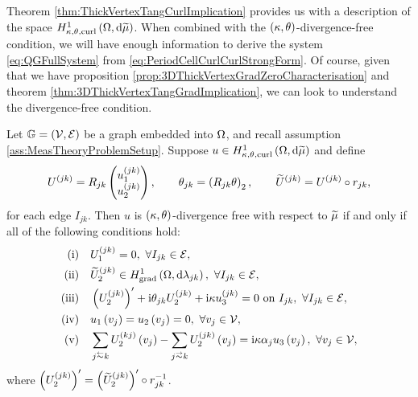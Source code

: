 Theorem \ref{thm:ThickVertexTangCurlImplication} provides us with a description of the space $H^1_{\kappa,\theta,\mathrm{curl}}\left( \Omega, \mathrm{d}\widetilde{\mu} \right)$.
When combined with the $\left( \kappa, \theta \right)$-divergence-free condition, we will have enough information to derive the system \eqref{eq:QGFullSystem} from \eqref{eq:PeriodCellCurlCurlStrongForm}.
Of course, given that we have proposition \ref{prop:3DThickVertexGradZeroCharacterisation} and theorem \ref{thm:3DThickVertexTangGradImplication}, we can look to understand the divergence-free condition.

\begin{prop} \label{prop:ThickVertexDivFree}
	Let $\mathbb{G}=\left( \mathcal{V}, \mathcal{E} \right)$ be a graph embedded into $\Omega$, and recall assumption \ref{ass:MeasTheoryProblemSetup}.
	Suppose $u\in H^1_{\kappa,\theta,\mathrm{curl}}\left( \Omega, \mathrm{d}\widetilde{\mu} \right)$ and define
	\begin{align*}
		U^{(jk)} = R_{jk}\begin{pmatrix} u_1^{(jk)} \\ u_2^{(jk)} \end{pmatrix},
		\qquad \theta_{jk} = \left(  R_{jk}\theta  \right)_2,
		\qquad \widetilde{U}^{(jk)} = U^{(jk)} \circ r_{jk},
	\end{align*}
	for each edge $I_{jk}$.
	Then $u$ is $\left( \kappa, \theta \right)$-divergence free with respect to $\widetilde{\mu}$ if and only if all of the following conditions hold:
	\begin{align*}
			\mathrm{(i)} \quad & U_1^{(jk)} = 0, \ \forall I_{jk}\in\edgeSet, \\
			\mathrm{(ii)} \quad & \widetilde{U}_2^{(jk)} \in\gradSob{\ddom}{\lambda_{jk}}, \ \forall I_{jk}\in\edgeSet, \\
			\mathrm{(iii)} \quad & \bracs{U_2^{(jk)}}' + \rmi\qm_{jk} U_2^{(jk)} + \rmi\wavenumber u_3^{(jk)} = 0 \text{ on } I_{jk}, \ \forall I_{jk}\in\edgeSet, \\
			\mathrm{(iv)} \quad & u_1\bracs{v_j} = u_2\bracs{v_j} = 0, \ \forall v_j\in\vertSet, \\
			\mathrm{(v)} \quad & \sum_{j\conRight k} U_2^{(kj)}\bracs{v_j} - \sum_{j\conLeft k} U_2^{(jk)}\bracs{v_j} = \rmi\wavenumber\alpha_j u_3\bracs{v_j}, \ \forall v_j\in\vertSet,
	\end{align*}
	where $\left( U_2^{(jk)} \right)' = \left( \widetilde{U}_2^{(jk)} \right)'\circ r_{jk}^{-1}$.
\end{prop}
